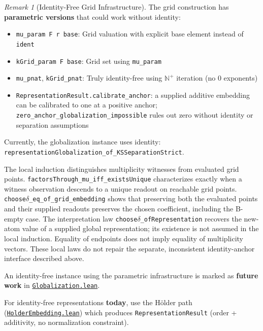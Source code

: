 \documentclass[11pt]{article}
\theoremstyle{definition}
\theoremstyle{remark}
\newtheorem{remark}[theorem]{Remark}
\begin{document}
\begin{remark}[Identity-Free Grid Infrastructure]
The grid construction has \textbf{parametric versions} that could work without identity:
\begin{itemize}
\item \texttt{mu\_param F r base}: Grid valuation with explicit base element instead of \texttt{ident}
\item \texttt{kGrid\_param F base}: Grid set using \texttt{mu\_param}
\item \texttt{mu\_pnat}, \texttt{kGrid\_pnat}: Truly identity-free using $\mathbb{N}^+$ iteration (no 0 exponents)
\item \texttt{RepresentationResult.calibrate\_anchor}: a supplied additive embedding can be calibrated to one at a positive anchor; \texttt{zero\_anchor\_globalization\_impossible} rules out zero without identity or separation assumptions
\end{itemize}

Currently, the globalization instance uses identity:
\\
\texttt{representationGlobalization\_of\_KSSeparationStrict}.

The local induction distinguishes multiplicity witnesses from evaluated grid points.
\texttt{factorsThrough\_mu\_iff\_existsUnique} characterizes exactly when a witness
observation descends to a unique readout on reachable grid points.
\texttt{choose$\delta$\_eq\_of\_grid\_embedding} shows that preserving both the evaluated
points and their supplied readouts preserves the chosen coefficient, including the B-empty case.
The interpretation law \texttt{choose$\delta$\_ofRepresentation} recovers the new-atom value
of a supplied global representation; its existence is not assumed in the local induction.
Equality of endpoints does not imply equality of multiplicity vectors. These local laws
do not repair the separate, inconsistent identity-anchor interface described above.

An identity-free instance using the parametric infrastructure is marked as \textbf{future work} in \href{https://github.com/zariuq/ks-foundations-of-inference/blob/main/KnuthSkilling/Additive/Proofs/GridInduction/Globalization.lean}{\texttt{Globalization.lean}}.

For identity-free representations \textbf{today}, use the Hölder path (\href{https://github.com/zariuq/ks-foundations-of-inference/blob/main/KnuthSkilling/Additive/Proofs/OrderedSemigroupEmbedding/HolderEmbedding.lean}{\texttt{HolderEmbedding.lean}})
which produces \texttt{RepresentationResult} (order + additivity, no normalization constraint).
\end{remark}
\end{document}
